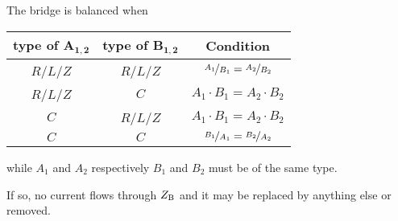 
\vspace{1pt}

The bridge is balanced when

\begin{center}
	\begin{tabular}{c|c|c}
		\toprule
		\textbf{type of $\boldsymbol{A_{1,2}}$} & \textbf{type of $\boldsymbol{B_{1,2}}$} & \textbf{Condition} \\
		\midrule
		$R$/$L$/$Z$ & $R$/$L$/$Z$ & $\nicefrac{A_1}{B_1} = \nicefrac{A_2}{B_2}$ \\
		$R$/$L$/$Z$ & $C$ & $A_1 \cdot B_1 = A_2 \cdot B_2$ \\
		$C$ & $R$/$L$/$Z$ & $A_1 \cdot B_1 = A_2 \cdot B_2$ \\
		$C$ & $C$ & $\nicefrac{B_1}{A_1} = \nicefrac{B_2}{A_2}$ \\
		\bottomrule
	\end{tabular}
\end{center}
while $A_1$ and $A_2$ respectively $B_1$ and $B_2$ must be of the same type.

If so, no current flows through $Z_{\text B}$ and it may be replaced by anything else or removed.